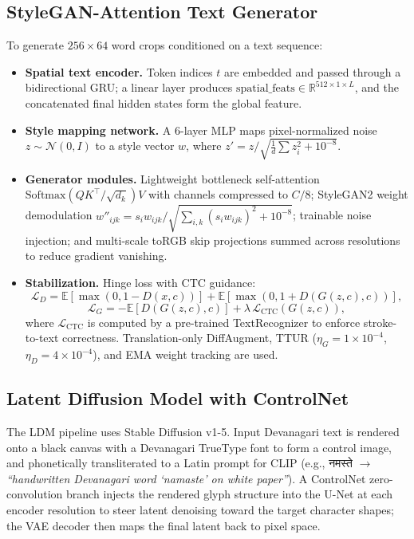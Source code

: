 \documentclass[12pt,a4paper]{report}
\newcommand{\dev}[1]{{\devfont #1}}
\begin{document}
\subsection{StyleGAN-Attention Text Generator}
To generate $256\times64$ word crops conditioned on a text sequence:
\begin{itemize}[itemsep=2pt]
  \item \textbf{Spatial text encoder.} Token indices $t$ are embedded and passed through a bidirectional GRU; a linear layer produces $\mathrm{spatial\_feats}\in\mathbb{R}^{512\times1\times L}$, and the concatenated final hidden states form the global feature.
  \item \textbf{Style mapping network.} A 6-layer MLP maps pixel-normalized noise $z\sim\mathcal{N}(0,I)$ to a style vector $w$, where $z' = z / \sqrt{\tfrac1d\sum z_i^2 + 10^{-8}}$.
  \item \textbf{Generator modules.} Lightweight bottleneck self-attention $\mathrm{Softmax}(QK^\top/\sqrt{d_k})V$ with channels compressed to $C/8$; StyleGAN2 weight demodulation $w''_{ijk} = s_i w_{ijk} / \sqrt{\sum_{i,k}(s_i w_{ijk})^2 + 10^{-8}}$; trainable noise injection; and multi-scale toRGB skip projections summed across resolutions to reduce gradient vanishing.
  \item \textbf{Stabilization.} Hinge loss with CTC guidance:
  \[
  \mathcal{L}_D = \mathbb{E}[\max(0, 1 - D(x,c))] + \mathbb{E}[\max(0, 1 + D(G(z,c),c))],
  \]
  \[
  \mathcal{L}_G = -\mathbb{E}[D(G(z,c),c)] + \lambda\,\mathcal{L}_{\mathrm{CTC}}(G(z,c)),
  \]
  where $\mathcal{L}_{\mathrm{CTC}}$ is computed by a pre-trained TextRecognizer to enforce stroke-to-text correctness. Translation-only DiffAugment, TTUR ($\eta_G = 1\times10^{-4}$, $\eta_D = 4\times10^{-4}$), and EMA weight tracking are used.
\end{itemize}

\subsection{Latent Diffusion Model with ControlNet}
The LDM pipeline uses Stable Diffusion v1-5. Input Devanagari text is rendered onto a black canvas with a Devanagari TrueType font to form a control image, and phonetically transliterated to a Latin prompt for CLIP (e.g., \dev{नमस्ते} $\rightarrow$ \textit{``handwritten Devanagari word `namaste' on white paper''}). A ControlNet zero-convolution branch injects the rendered glyph structure into the U-Net at each encoder resolution to steer latent denoising toward the target character shapes; the VAE decoder then maps the final latent back to pixel space.
\end{document}
